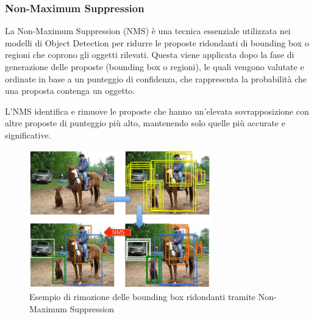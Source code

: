 \newpage

\subsubsection{Non-Maximum Suppression}
La Non-Maximum Suppression (NMS) è una tecnica essenziale utilizzata nei modelli di Object Detection per ridurre le proposte ridondanti di bounding box o regioni che coprono gli oggetti rilevati. 
Questa viene applicata dopo la fase di generazione delle proposte (bounding box o regioni), le quali vengono valutate e ordinate in base a un punteggio di confidenza, che rappresenta la probabilità che una proposta contenga un oggetto.

L'NMS identifica e rimuove le proposte che hanno un'elevata sovrapposizione con altre proposte di punteggio più alto, mantenendo solo quelle più accurate e significative.

\begin{figure}[ht]
    \centering
    \includegraphics[width=0.7\textwidth]{files/capitoli/1-object-detection/assets/nms-example.png}
    \caption{\label{fig:nms-example}Esempio di rimozione delle bounding box ridondanti tramite Non-Maximum Suppression\cite{5}}
\end{figure}

\newpage
